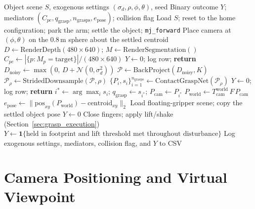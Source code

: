 \documentclass[11pt,a4paper]{report}
\begin{document}
\begin{algorithm}[hbt!]
\caption{Experiment Pipeline}
\label{alg:pipeline}
\begin{algorithmic}[1]
\Require Object scene $S$, exogenous settings $(\sigma_d, \rho, \phi, \theta)$, seed
\Ensure Binary outcome $Y$; mediators $(C_{pc}, q_{\text{grasp}}, n_{\text{grasps}}, e_{\text{pose}})$; collision flag
\State Load $S$; reset to the home configuration; park the arm; settle the object; \texttt{mj\_forward}
\State Place camera at $(\phi, \theta)$ on the $0.8$\,m sphere about the settled centroid
\State $D \gets \mathrm{RenderDepth}(480 \times 640)$; \quad $M \gets \mathrm{RenderSegmentation}()$
\State $C_{pc} \gets |\{p : M_p = \mathrm{target}\}|/(480 \times 640)$ 
    \State $Y \gets 0$; log row; \textbf{return} 
\EndIf
\State $D_{\mathrm{noisy}} \gets \max(0,\, D + \mathcal{N}(0,\sigma_d^2))$ 
\State $\mathcal{P} \gets \mathrm{BackProject}(D_{\mathrm{noisy}}, K)$ 
\State $\mathcal{P}_{\rho} \gets \mathrm{StridedDownsample}(\mathcal{P}, \rho)$
\State $\{P_i, s_i\}_{i=1}^{n_{\text{grasps}}} \gets \mathrm{ContactGraspNet}(\mathcal{P}_{\rho})$
    \State $Y \gets 0$; log row; \textbf{return} 
\EndIf
\State $i^* \gets \arg\max_i s_i$; \quad $q_{\text{grasp}} \gets s_{i^*}$; \quad $P_{\mathrm{cam}} \gets P_{i^*}$
\State $P_{\mathrm{world}} \gets T_{\mathrm{cam}}^{\mathrm{world}}\, F\, P_{\mathrm{cam}}$ 
\State $e_{\text{pose}} \gets \bigl\lVert \mathrm{pos}_{xy}(P_{\mathrm{world}}) - \mathrm{centroid}_{xy} \bigr\rVert_2$ 
\State Load floating-gripper scene; copy the settled object pose
    \State $Y \gets 0$ 
\Else
    \State Close fingers; apply lift/shake (Section~\ref{sec:grasp_execution})
    \State $Y \gets \mathbf{1}\{\text{held in footprint and lift threshold met throughout disturbance}\}$
\EndIf
\State Log exogenous settings, mediators, collision flag, and $Y$ to CSV
\end{algorithmic}
\end{algorithm}

\section{Camera Positioning and Virtual Viewpoint}
\label{sec:camera_positioning}
\end{document}

